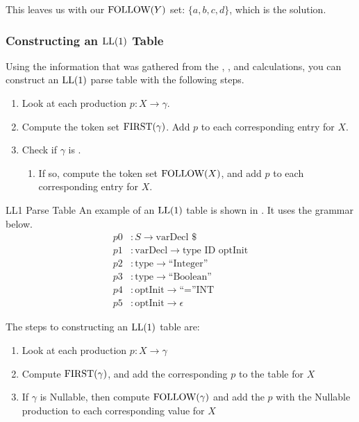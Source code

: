 \begin{blackbox}
  This leaves us with our $\operatorname{\text{FOLLOW}}(Y)$ set: $\lbrace a, b, c, d \rbrace$, which is the solution.
\end{blackbox}

\subsubsection{Constructing an \texorpdfstring{$\operatorname{\text{LL}}(1)$}{LL(1)} Table}\label{subsubsec:Construct_LL1_Table}
Using the information that was gathered from the , , and  calculations, you can construct an $\operatorname{\text{LL}}(1)$ parse table with the following steps.
\begin{enumerate}[noitemsep]
\item Look at each production $p: X \rightarrow \gamma$.
\item Compute the token set $\operatorname{\text{FIRST}}(\gamma)$. Add $p$ to each corresponding entry for $X$.
\item Check if $\gamma$ is .
  \begin{enumerate}[noitemsep]
  \item If so, compute the token set $\operatorname{\text{FOLLOW}}(X)$, and add $p$ to each corresponding entry for $X$.
  \end{enumerate}
\end{enumerate}

\begin{example}[]{LL1 Parse Table}
  An example of an $\operatorname{\text{LL}}(1)$ table is shown in
  . It uses the grammar below.
  \begin{align*}
    p0&: S \rightarrow \text{varDecl } \$ \\
    p1&: \text{varDecl} \rightarrow \text{type } \text{ID } \text{optInit} \\
    p2&: \text{type} \rightarrow \text{``Integer''} \\
    p3&: \text{type} \rightarrow \text{``Boolean''} \\
    p4&: \text{optInit} \rightarrow \text{``=''} \text{INT} \\
    p5&: \text{optInit} \rightarrow \epsilon
  \end{align*}

  The steps to constructing an $\operatorname{\text{LL}}(1)$ table are:
  \begin{enumerate}[noitemsep]
  \item Look at each production $p: X \rightarrow \gamma$
  \item Compute $\operatorname{\text{FIRST}}(\gamma)$, and add the corresponding $p$ to the table for $X$
  \item If $\gamma$ is Nullable, then compute $\operatorname{\text{FOLLOW}}(\gamma)$ and add the $p$ with the Nullable production to each corresponding value for $X$
  \end{enumerate}
\end{example}

